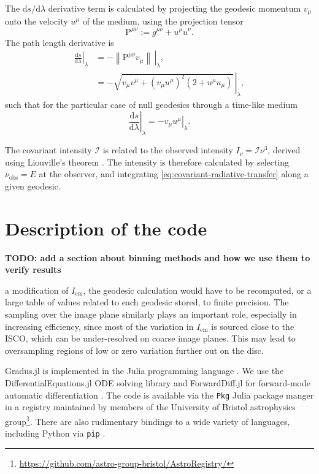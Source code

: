 \documentclass[fleqn,usenatbib]{mnras}
\newcommand{\todo}[1]{{\noindent \bf \color{red} TODO: #1}}
\newcommand{\Gradus}{Gradus.jl }
\renewcommand{\d}{\text{d}}
\begin{document}
The $\d s / \d \lambda$ derivative term is calculated by projecting the geodesic momentum $v_\mu$ onto the velocity $u^\mu$ of the medium, using the projection tensor
\begin{equation}
    \mathrm{P}^{\mu\nu} := g^{\mu\nu} + u^\mu u^\nu.
\end{equation}
The path length derivative is
\begin{align}
    \left. \frac{\d s}{\d \lambda} \right\rvert_\lambda
    &= - \left. \left\lVert \mathrm{P}^{\mu\nu} v_\mu\right\rVert\, \right\rvert_\lambda,\\
    &= - \left. \sqrt{v_\mu v^\mu + \left(v_\mu u^\mu\right)^2 \left(2 + u^\mu u_\mu\right)} \, \right\rvert_\lambda,
\end{align}
such that for the particular case of null geodesics through a time-like medium
\begin{equation}
    \left. \frac{\d s}{\d \lambda} \right\rvert_\lambda = - \left. v_\mu u^\mu \right\rvert_\lambda.
\end{equation}

The covariant intensity $\mathcal{I}$ is related to the observed intensity $I_\nu = \mathcal{I} \nu^3$, derived using Liouville's theorem \citep{todo}. The intensity is therefore calculated by selecting $\nu_\text{obs} = E$ at the observer, and integrating \eqref{eq:covariant-radiative-transfer} along a given geodesic.


\section{Description of the code}

\todo{
    add a section about binning methods and how we use them to verify results

a modification of $I_\text{em}$, the geodesic calculation
would have to be recomputed, or a large table of values related to each geodesic
stored, to finite precision. The sampling over the image plane similarly plays
an important role, especially in increasing efficiency, since most of the
variation in $I_\text{em}$ is sourced close to the ISCO, which can be
under-resolved on coarse image planes. This may lead to oversampling regions of
low or zero variation further out on the disc.
}

\Gradus is implemented in the Julia programming language \citep{Bezanson_Julia_A_fresh_2017}. We use the DifferentialEquations.jl ODE solving library and ForwardDiff.jl for forward-mode automatic differentiation \citep{RevelsLubinPapamarkou2016}. The code is available via the \texttt{Pkg} Julia package manger in a registry maintained by members of the University of Bristol astrophysics group\footnote{\url{https://github.com/astro-group-bristol/AstroRegistry/}}. There are also rudimentary bindings to a wide variety of languages, including Python via \texttt{pip} \citep{}.
\end{document}
